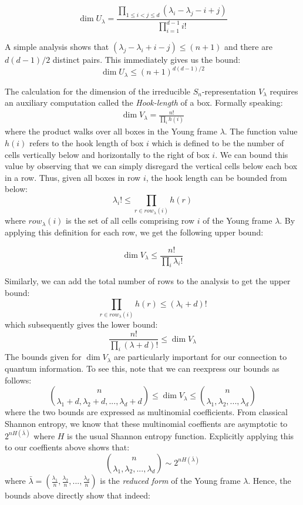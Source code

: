 \documentclass[12pt]{article}%
\begin{document}
$$ \dim U_\lambda = \frac{\prod_{1 \leq i<j \leq d} (\lambda_i - \lambda_j - i + j)}{\prod_{i=1}^{d-1} i!} $$

A simple analysis shows that $(\lambda_j - \lambda_i +i - j) \leq (n+1)$ and there are $d(d-1)/2$ distinct pairs. This immediately gives us the bound:
\begin{equation}\label{ubound}
  \dim U_\lambda \leq (n + 1)^{d(d-1)/2}
\end{equation}

The calculation for the dimension of the irreducible $S_n$-representation $V_\lambda$ requires an auxiliary computation called the \textit{Hook-length} of a box. Formally speaking:
\begin{gather*}
  \dim V_\lambda = \frac{n!}{\prod_{i} h(i)}
\end{gather*}
where the product walks over all boxes in the Young frame $\lambda$. The function value $h(i)$ refers to the hook length of box $i$ which is defined to be the number of cells vertically below and horizontally to the right of box $i$. We can bound this value by observing that we can simply disregard the vertical cells below each box in a row. Thus, given all boxes in row $i$, the hook length can be bounded from below:
$$ \lambda_i! \leq \prod_{r \in row_\lambda(i)} h(r) $$ where $row_\lambda(i)$ is the set of all cells comprising row $i$ of the Young frame $\lambda$. By applying this definition for each row, we get the following upper bound:

\begin{equation}\label{vbound}
  \dim V_\lambda \leq \frac{n!}{\prod_i \lambda_i!}
\end{equation}

\noindent Similarly, we can add the total number of rows to the analysis to get the upper bound:
$$\prod_{r \in row_\lambda(i)} h(r) \leq (\lambda_i + d)!$$ which subsequently gives the lower bound:
$$ \frac{n!}{\prod_i (\lambda +d)!} \leq \dim V_{\lambda} $$
The bounds given for $\dim V_\lambda$ are particularly important for our connection to quantum information. To see this, note that we can reexpress our bounds as follows:
$${n \choose \lambda_1+d,\lambda_2+d,...,\lambda_d+d} \leq \dim V_{\lambda} \leq {n \choose \lambda_1,\lambda_2,...,\lambda_d} $$ where the two bounds are expressed as multinomial coefficients. From classical Shannon entropy, we know that these multinomial coeffients are asymptotic to $2^{nH(\bar{\lambda})}$ where $H$ is the usual Shannon entropy function. Explicitly applying this to our coeffients above shows that:
$$ {n \choose \lambda_1,\lambda_2,...,\lambda_d} \sim 2^{nH(\bar{\lambda})}$$
where $\bar{\lambda} = (\frac{\lambda_1}{n}, \frac{\lambda_2}{n},...,\frac{\lambda_d}{n})$ is the \textit{reduced form} of the Young frame $\lambda$. Hence, the bounds above directly show that indeed:
\end{document}
